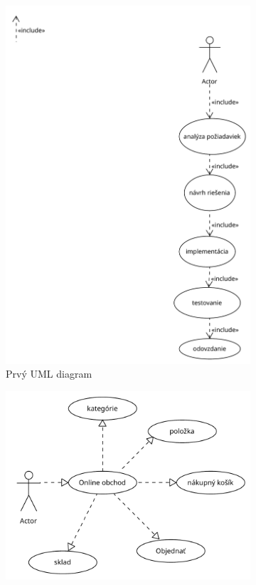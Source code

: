 \documentclass[10pt,twocolumn,twoside,slovak,a4paper]{article}
\begin{document}
\begin{figure}[h!]
    \centering
    \begin{subfigure}[t]{0.48\columnwidth}
        \centering
        \includegraphics[width=\linewidth]{diagram1.pdf}
        \caption{Prvý UML diagram}
        \label{fig:diagram1}
    \end{subfigure}
    \hfill
    \begin{subfigure}[t]{0.48\columnwidth}
        \centering
        \includegraphics[width=\linewidth]{diagram3.pdf}

\end{subfigure}
\end{figure}
\end{document}
